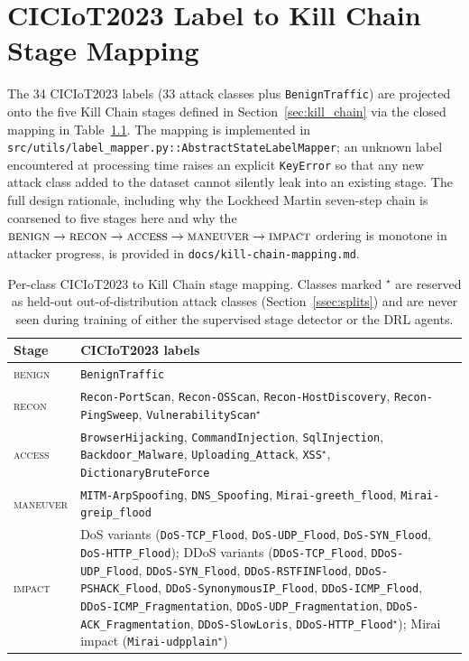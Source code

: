 \chapter{CICIoT2023 Label to Kill Chain Stage Mapping}\label{app:kc_mapping}

The 34 CICIoT2023 labels (33 attack classes plus \texttt{BenignTraffic}) are projected onto the five Kill Chain stages defined in Section~\ref{sec:kill_chain} via the closed mapping in Table~\ref{tab:kc_mapping}. The mapping is implemented in \texttt{src/utils/label\_mapper.py::AbstractStateLabelMapper}; an unknown label encountered at processing time raises an explicit \texttt{KeyError} so that any new attack class added to the dataset cannot silently leak into an existing stage. The full design rationale, including why the Lockheed Martin seven-step chain is coarsened to five stages here and why the $\textsc{benign} \to \textsc{recon} \to \textsc{access} \to \textsc{maneuver} \to \textsc{impact}$ ordering is monotone in attacker progress, is provided in \texttt{docs/kill-chain-mapping.md}.

\begin{table}[!htbp]
\centering
\caption{Per-class CICIoT2023 to Kill Chain stage mapping. Classes marked $^\star$ are reserved as held-out out-of-distribution attack classes (Section~\ref{ssec:splits}) and are never seen during training of either the supervised stage detector or the DRL agents.}
\label{tab:kc_mapping}
\begin{tabular}{l p{10cm}}
\hline
Stage & CICIoT2023 labels \\
\hline
\textsc{benign}  & \texttt{BenignTraffic} \\
\hline
\textsc{recon}   & \texttt{Recon-PortScan}, \texttt{Recon-OSScan}, \texttt{Recon-HostDiscovery}, \texttt{Recon-PingSweep}, \texttt{VulnerabilityScan}$^\star$ \\
\hline
\textsc{access}  & \texttt{BrowserHijacking}, \texttt{CommandInjection}, \texttt{SqlInjection}, \texttt{Backdoor\_Malware}, \texttt{Uploading\_Attack}, \texttt{XSS}$^\star$, \texttt{DictionaryBruteForce} \\
\hline
\textsc{maneuver} & \texttt{MITM-ArpSpoofing}, \texttt{DNS\_Spoofing}, \texttt{Mirai-greeth\_flood}, \texttt{Mirai-greip\_flood} \\
\hline
\textsc{impact}  & DoS variants (\texttt{DoS-TCP\_Flood}, \texttt{DoS-UDP\_Flood}, \texttt{DoS-SYN\_Flood}, \texttt{DoS-HTTP\_Flood}); DDoS variants (\texttt{DDoS-TCP\_Flood}, \texttt{DDoS-UDP\_Flood}, \texttt{DDoS-SYN\_Flood}, \texttt{DDoS-RSTFINFlood}, \texttt{DDoS-PSHACK\_Flood}, \texttt{DDoS-SynonymousIP\_Flood}, \texttt{DDoS-ICMP\_Flood}, \texttt{DDoS-ICMP\_Fragmentation}, \texttt{DDoS-UDP\_Fragmentation}, \texttt{DDoS-ACK\_Fragmentation}, \texttt{DDoS-SlowLoris}, \texttt{DDoS-HTTP\_Flood}$^\star$); Mirai impact (\texttt{Mirai-udpplain}$^\star$) \\
\hline
\end{tabular}
\end{table}

